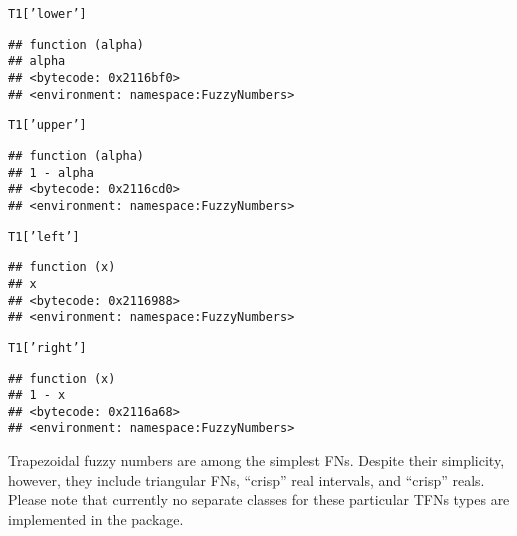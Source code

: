 \documentclass[11pt]{article}\usepackage[]{graphicx}\usepackage[]{color}
\makeatletter
\newcommand{\hlstr}[1]{\textcolor[rgb]{0.192,0.494,0.8}{#1}}%
\newcommand{\hlstd}[1]{\textcolor[rgb]{0.345,0.345,0.345}{#1}}%
\newenvironment{kframe}{%
 \def\at@end@of@kframe{}%
 \ifinner\ifhmode%
  \def\at@end@of@kframe{\end{minipage}}%
  \begin{minipage}{\columnwidth}%
 \fi\fi%
 \def\FrameCommand##1{\hskip\@totalleftmargin \hskip-\fboxsep
 \colorbox{shadecolor}{##1}\hskip-\fboxsep
     \hskip-\linewidth \hskip-\@totalleftmargin \hskip\columnwidth}%
 \MakeFramed {\advance\hsize-\width
   \@totalleftmargin\z@ \linewidth\hsize
   \@setminipage}}%
 {\par\unskip\endMakeFramed%
 \at@end@of@kframe}
\newenvironment{knitrout}{}{} %
\makeatother
\begin{document}
\begin{knitrout}\small
{}\color{fgcolor}\begin{kframe}
\begin{alltt}
\hlstd{T1[}\hlstr{'lower'}\hlstd{]}
\end{alltt}
\begin{verbatim}
## function (alpha) 
## alpha
## <bytecode: 0x2116bf0>
## <environment: namespace:FuzzyNumbers>
\end{verbatim}
\begin{alltt}
\hlstd{T1[}\hlstr{'upper'}\hlstd{]}
\end{alltt}
\begin{verbatim}
## function (alpha) 
## 1 - alpha
## <bytecode: 0x2116cd0>
## <environment: namespace:FuzzyNumbers>
\end{verbatim}
\begin{alltt}
\hlstd{T1[}\hlstr{'left'}\hlstd{]}
\end{alltt}
\begin{verbatim}
## function (x) 
## x
## <bytecode: 0x2116988>
## <environment: namespace:FuzzyNumbers>
\end{verbatim}
\begin{alltt}
\hlstd{T1[}\hlstr{'right'}\hlstd{]}
\end{alltt}
\begin{verbatim}
## function (x) 
## 1 - x
## <bytecode: 0x2116a68>
## <environment: namespace:FuzzyNumbers>
\end{verbatim}
\end{kframe}
\end{knitrout}



\bigskip
Trapezoidal fuzzy numbers are among the simplest FNs.
Despite their simplicity, however, they include triangular FNs,
``crisp'' real intervals, and ``crisp'' reals.
Please note that currently no separate classes for these particular TFNs types
are implemented in the package.
\end{document}
